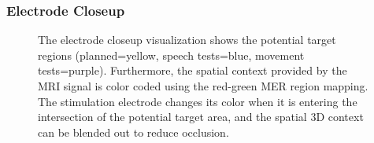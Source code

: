 \documentclass{vgtc}                          %
\begin{document}
\subsubsection{Electrode Closeup}\label{sec:overview:placement:targetareaview}

\begin{figure}[t]
  \centering
  \caption{The electrode closeup visualization shows the potential target regions (planned=yellow, speech tests=blue, movement tests=purple). Furthermore, the spatial context provided by the MRI signal is color coded using the red-green MER region mapping. The stimulation electrode changes its color when it is entering the intersection of the potential target area, and the spatial 3D context can be blended out to reduce occlusion.}
  \label{fig:targetregion}
\end{figure}
\end{document}
